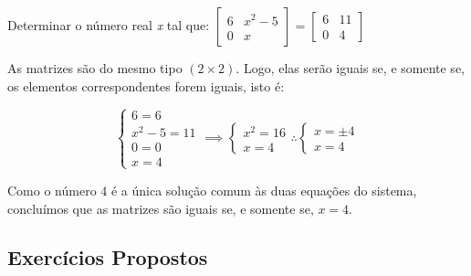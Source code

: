 \begin{exercise}
  Determinar o número real \textit{x} tal que: $\begin{bmatrix}
    6 & x^2-5 \\
    0 & x
  \end{bmatrix} = \begin{bmatrix}
    6 & 11 \\
    0 & 4
  \end{bmatrix}$

  As matrizes são do mesmo tipo $(2 \times 2)$. Logo, elas serão iguais se, e somente se, os elementos 
  correspondentes forem iguais, isto é:

  \begin{equation*}
    \begin{cases}
      6 = 6 \\
      x^2 - 5 = 11 \\
      0 = 0 \\
      x = 4
    \end{cases}
    \implies 
    \begin{cases}
      x^2 = 16 \\
      x = 4
    \end{cases}
    \therefore
    \begin{cases}
      x = \pm 4 \\
      x = 4
    \end{cases}
  \end{equation*}

  Como o número $4$ é a única solução comum às duas equações do sistema, concluímos que as matrizes são iguais se, e 
  somente se, $x = 4$.
  
\end{exercise}

\subsection{Exercícios Propostos}

